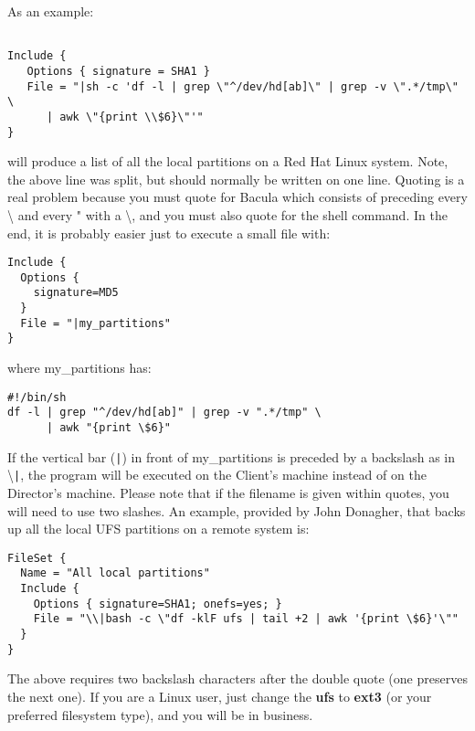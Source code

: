 \begin{itemize}
   As an  example: 

\footnotesize
\begin{verbatim}
 
Include {
   Options { signature = SHA1 }
   File = "|sh -c 'df -l | grep \"^/dev/hd[ab]\" | grep -v \".*/tmp\" \
      | awk \"{print \\$6}\"'"
}
\end{verbatim}
\normalsize

   will produce a list of all the local partitions on a Red Hat Linux system.
   Note, the above line was split, but should normally  be written on one line. 
   Quoting is a real problem because you must quote for Bacula  which consists of
   preceding every \textbackslash{} and every " with a \textbackslash{}, and 
   you must also quote for the shell command. In the end, it is probably  easier
   just to execute a small file with: 


\footnotesize
\begin{verbatim}
Include {
  Options {
    signature=MD5
  }
  File = "|my_partitions"
}
\end{verbatim}
\normalsize

   where my\_partitions has: 

\footnotesize
\begin{verbatim}
#!/bin/sh
df -l | grep "^/dev/hd[ab]" | grep -v ".*/tmp" \
      | awk "{print \$6}"
\end{verbatim}
\normalsize

   If the vertical bar (\verb+|+) in front of my\_partitions is preceded by a
   backslash as in \textbackslash{}\verb+|+, the program will be executed on the
   Client's machine instead of on the Director's machine.
   Please note that if the filename is given within quotes, you
   will need to use two slashes.  An example, provided by John Donagher,
   that backs up all the local UFS partitions on a remote system is:

\footnotesize
\begin{verbatim}
FileSet {
  Name = "All local partitions"
  Include {
    Options { signature=SHA1; onefs=yes; }
    File = "\\|bash -c \"df -klF ufs | tail +2 | awk '{print \$6}'\""
  }
}
\end{verbatim}
\normalsize

   The above requires two backslash characters after the double quote (one
   preserves  the next one). If you are a Linux user, just change the {\bf ufs}
   to  {\bf ext3} (or your preferred filesystem type), and you will be in 
   business.  


\end{itemize}
